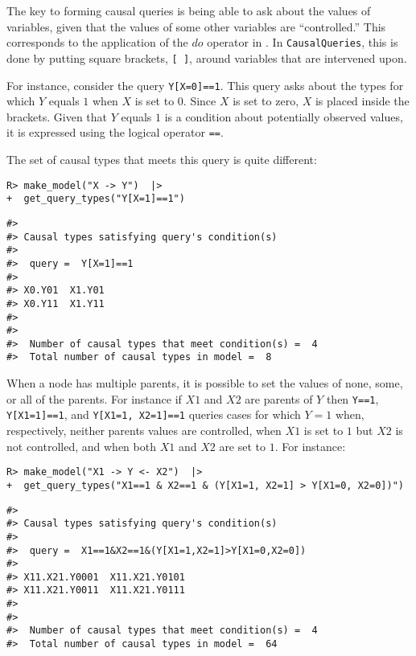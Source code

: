 \documentclass[
  11pt,
  article]{jss}
\begin{document}
The key to forming causal queries is being able to ask about the values
of variables, given that the values of some other variables are
``controlled.'' This corresponds to the application of the \(do\)
operator in \citet{pearl_causality_2009}. In \texttt{CausalQueries},
this is done by putting square brackets, \texttt{{[}\ {]}}, around
variables that are intervened upon.

For instance, consider the query \texttt{Y{[}X=0{]}==1}. This query asks
about the types for which \(Y\) equals \(1\) when \(X\) is set to \(0\).
Since \(X\) is set to zero, \(X\) is placed inside the brackets. Given
that \(Y\) equals \(1\) is a condition about potentially observed
values, it is expressed using the logical operator \texttt{==}.

The set of causal types that meets this query is quite different:

\begin{verbatim}
R> make_model("X -> Y")  |> 
+  get_query_types("Y[X=1]==1")
\end{verbatim}

\begin{verbatim}
#> 
#> Causal types satisfying query's condition(s)  
#> 
#>  query =  Y[X=1]==1 
#> 
#> X0.Y01  X1.Y01
#> X0.Y11  X1.Y11
#> 
#> 
#>  Number of causal types that meet condition(s) =  4
#>  Total number of causal types in model =  8
\end{verbatim}

When a node has multiple parents, it is possible to set the values of
none, some, or all of the parents. For instance if \(X1\) and \(X2\) are
parents of \(Y\) then \texttt{Y==1}, \texttt{Y{[}X1=1{]}==1}, and
\texttt{Y{[}X1=1,\ X2=1{]}==1} queries cases for which \(Y=1\) when,
respectively, neither parents values are controlled, when \(X1\) is set
to \(1\) but \(X2\) is not controlled, and when both \(X1\) and \(X2\)
are set to \(1\). For instance:

\begin{verbatim}
R> make_model("X1 -> Y <- X2")  |>
+  get_query_types("X1==1 & X2==1 & (Y[X1=1, X2=1] > Y[X1=0, X2=0])")
\end{verbatim}

\begin{verbatim}
#> 
#> Causal types satisfying query's condition(s)  
#> 
#>  query =  X1==1&X2==1&(Y[X1=1,X2=1]>Y[X1=0,X2=0]) 
#> 
#> X11.X21.Y0001  X11.X21.Y0101
#> X11.X21.Y0011  X11.X21.Y0111
#> 
#> 
#>  Number of causal types that meet condition(s) =  4
#>  Total number of causal types in model =  64
\end{verbatim}
\end{document}
